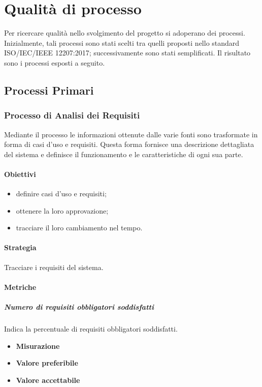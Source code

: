 \section{Qualità di processo}
Per ricercare qualità nello svolgimento del progetto si adoperano dei processi. Inizialmente, tali processi sono stati scelti tra quelli proposti nello standard ISO/IEC/IEEE 12207:2017; successivamente sono stati semplificati.\newline 
Il risultato sono i processi esposti a seguito.

\subsection{Processi Primari}
	\subsubsection{Processo di Analisi dei Requisiti}
	Mediante il processo le informazioni ottenute dalle varie fonti sono trasformate in forma di casi d'uso e requisiti.
	Questa forma fornisce una descrizione dettagliata del sistema e definisce il funzionamento e le caratteristiche di ogni sua parte.
		\paragraph{Obiettivi}
		\begin{itemize}
			\item definire casi d'uso e requisiti;
			\item ottenere la loro approvazione;
			\item tracciare il loro cambiamento nel tempo.
		\end{itemize}		
		\paragraph{Strategia}
		Tracciare i requisiti del sistema.
		\paragraph{Metriche}
			\subparagraph{Numero di requisiti obbligatori soddisfatti} Indica la percentuale di requisiti obbligatori soddisfatti.
			\begin{itemize}
				\item \textbf{Misurazione}
				\item \textbf{Valore preferibile}
				\item \textbf{Valore accettabile}
			\end{itemize}
			
